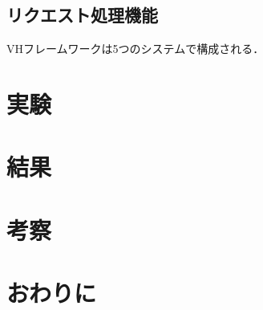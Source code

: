 \documentclass[a4paper,12pt]{jreport}
\begin{document}
\section{リクエスト処理機能}

VHフレームワークは5つのシステムで構成される．


\chapter{実験}

\chapter{結果}

\chapter{考察}

\chapter{おわりに}
\end{document}
